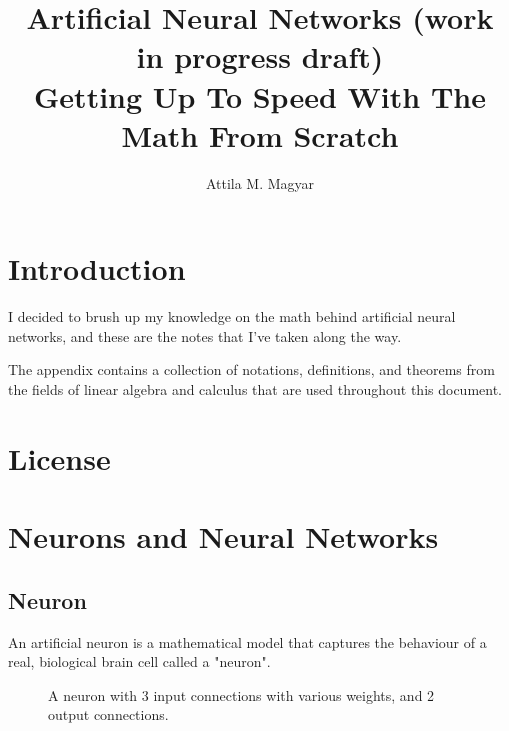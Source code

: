 \documentclass[titlepage]{article}
\title{%
  Artificial Neural Networks (work in progress draft) \\
  \large Getting Up To Speed With The Math From Scratch
}
\author{Attila M. Magyar}
\begin{document}
\begin{titlepage}\maketitle\end{titlepage}

  \tableofcontents

\newpage

  \section{Introduction}

    I decided to brush up my knowledge on the math behind artificial neural
    networks, and these are the notes that I've taken along the way.

    The appendix contains a collection of notations, definitions, and theorems
    from the fields of linear algebra and calculus that are used throughout
    this document.

  \section{License}

    \doclicenseThis

\newpage

  \section{Neurons and Neural Networks}

    \subsection{Neuron}

      An artificial neuron is a mathematical model that captures the behaviour
      of a real, biological brain cell called a "neuron".

      \begin{figure}[!htb]
        \centering
        \caption{%
          A neuron with 3 input connections with various weights,
          and 2 output connections.
        }
      \end{figure}
\end{document}
